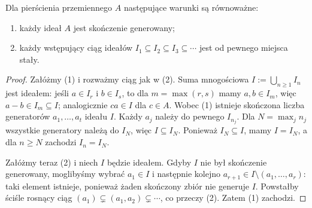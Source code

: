 \begin{lemat}
\label{lem:acc}
Dla pierścienia przemiennego $A$ następujące warunki są równoważne:
\begin{enumerate}[label=\arabic*)]
\item każdy ideał $A$ jest skończenie generowany;
\item każdy wstępujący ciąg ideałów
$I_1\subseteq I_2\subseteq I_3\subseteq\cdots$
jest od pewnego miejsca stały.
\end{enumerate}
\end{lemat}
\begin{proof}
Załóżmy (1) i rozważmy ciąg jak w (2).
Suma mnogościowa $I:=\bigcup_{n\ge1}I_n$ jest ideałem:
jeśli $a\in I_r$ i $b\in I_s$, to dla $m=\max(r,s)$
mamy $a,b\in I_m$, więc $a-b\in I_m\subseteq I$;
analogicznie $ca\in I$ dla $c\in A$.
Wobec (1) istnieje skończona liczba generatorów
$a_1,\dots,a_t$ ideału $I$. Każdy $a_j$ należy do pewnego
$I_{n_j}$. Dla $N=\max_j n_j$ wszystkie generatory należą
do $I_N$, więc $I\subseteq I_N$. Ponieważ $I_N\subseteq I$,
mamy $I=I_N$, a dla $n\ge N$ zachodzi $I_n=I_N$.

Załóżmy teraz (2) i niech $I$ będzie ideałem.
Gdyby $I$ nie był skończenie generowany, moglibyśmy wybrać
$a_1\in I$ i następnie kolejno $a_{r+1}\in I\setminus(a_1,\dots,a_r)$: taki element istnieje, ponieważ żaden
skończony zbiór nie generuje $I$.
Powstałby ściśle rosnący ciąg
$(a_1)\subsetneq(a_1,a_2)\subsetneq\cdots$,
co przeczy (2). Zatem (1) zachodzi.
\end{proof}

